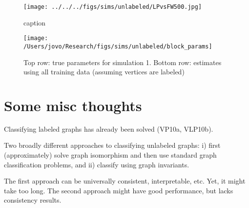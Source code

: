 \begin{figure}[htbp]
	\centering
		\texttt{[image: ../../../figs/sims/unlabeled/LPvsFW500.jpg]}
	\caption{caption}
	\label{fig:figs_sims_unlabeled_LPvsFW500}
\end{figure}


\begin{figure}[!ht]
\centering \texttt{[image: /Users/jovo/Research/figs/sims/unlabeled/block\_params]}
\caption{Top row: true parameters for simulation 1.  Bottom row: estimates using all training data (assuming vertices are labeled)
}
\label{fig:sim1_params}
\end{figure}




\section{Some misc thoughts} %
\label{sec:introduction}


Classifying labeled graphs has already been solved (VP10a, VLP10b).

Two broadly different approaches to classifying unlabeled graphs: i) first (approximately) solve graph isomorphism and then use standard graph classification problems, and ii) classify using graph invariants.  

The first approach can be universally consistent, interpretable, etc.  Yet, it might take too long.  The second approach might have good performance, but lacks consistency results.


